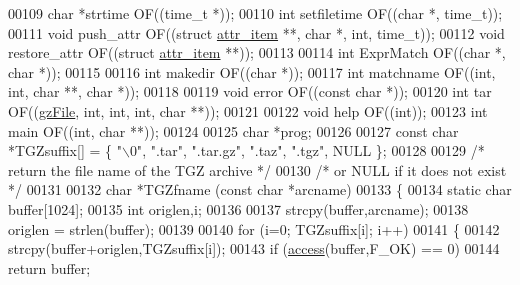 \begin{DoxyCode}
00109 \textcolor{keywordtype}{char} *strtime           OF((time\_t *));
00110 \textcolor{keywordtype}{int} setfiletime         OF((\textcolor{keywordtype}{char} *, time\_t));
00111 \textcolor{keywordtype}{void} push\_attr          OF((\textcolor{keyword}{struct} \hyperlink{structattr__item}{attr\_item} **, \textcolor{keywordtype}{char} *, \textcolor{keywordtype}{int}, time\_t));
00112 \textcolor{keywordtype}{void} restore\_attr       OF((\textcolor{keyword}{struct} \hyperlink{structattr__item}{attr\_item} **));
00113 
00114 \textcolor{keywordtype}{int} ExprMatch           OF((\textcolor{keywordtype}{char} *, \textcolor{keywordtype}{char} *));
00115 
00116 \textcolor{keywordtype}{int} makedir             OF((\textcolor{keywordtype}{char} *));
00117 \textcolor{keywordtype}{int} matchname           OF((\textcolor{keywordtype}{int}, \textcolor{keywordtype}{int}, \textcolor{keywordtype}{char} **, \textcolor{keywordtype}{char} *));
00118 
00119 \textcolor{keywordtype}{void} error              OF((\textcolor{keyword}{const} \textcolor{keywordtype}{char} *));
00120 \textcolor{keywordtype}{int} tar                 OF((\hyperlink{structgz_file__s}{gzFile}, \textcolor{keywordtype}{int}, \textcolor{keywordtype}{int}, \textcolor{keywordtype}{int}, \textcolor{keywordtype}{char} **));
00121 
00122 \textcolor{keywordtype}{void} help               OF((\textcolor{keywordtype}{int}));
00123 \textcolor{keywordtype}{int} main                OF((\textcolor{keywordtype}{int}, \textcolor{keywordtype}{char} **));
00124 
00125 \textcolor{keywordtype}{char} *prog;
00126 
00127 \textcolor{keyword}{const} \textcolor{keywordtype}{char} *TGZsuffix[] = \{ \textcolor{stringliteral}{"\(\backslash\)0"}, \textcolor{stringliteral}{".tar"}, \textcolor{stringliteral}{".tar.gz"}, \textcolor{stringliteral}{".taz"}, \textcolor{stringliteral}{".tgz"}, NULL \};
00128 
00129 \textcolor{comment}{/* return the file name of the TGZ archive */}
00130 \textcolor{comment}{/* or NULL if it does not exist */}
00131 
00132 \textcolor{keywordtype}{char} *TGZfname (\textcolor{keyword}{const} \textcolor{keywordtype}{char} *arcname)
00133 \{
00134   \textcolor{keyword}{static} \textcolor{keywordtype}{char} buffer[1024];
00135   \textcolor{keywordtype}{int} origlen,i;
00136 
00137   strcpy(buffer,arcname);
00138   origlen = strlen(buffer);
00139 
00140   \textcolor{keywordflow}{for} (i=0; TGZsuffix[i]; i++)
00141     \{
00142        strcpy(buffer+origlen,TGZsuffix[i]);
00143        \textcolor{keywordflow}{if} (\hyperlink{structaccess}{access}(buffer,F\_OK) == 0)
00144          \textcolor{keywordflow}{return} buffer;

\end{DoxyCode}
